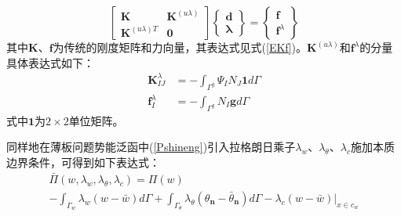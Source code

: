 \begin{equation}
    \begin{bmatrix}\pmb{K}&\pmb{K}^{(u\lambda)}\\\pmb{K}^{(u\lambda) T}&\pmb{0}\end{bmatrix}
    \left\{\begin{matrix}\pmb{d}\\\pmb{\lambda}\end{matrix}\right\}=
    \left\{\begin{matrix}\pmb{f}\\\pmb{f}^{\lambda}\end{matrix}\right\}
\end{equation}
其中$\pmb{K}$、$\pmb{f}$为传统的刚度矩阵和力向量，其表达式见式(\ref{EKf})。$\pmb{K}^{(u\lambda)}$和$\pmb{f}^{\lambda}$的分量具体表达式如下：
\begin{align}
    \pmb K_{I\!J}^{\lambda}&=-\int_{\Gamma^g}\Psi_IN_J \boldsymbol 1d\Gamma\\
    \pmb f_I^{\lambda}&=-\int_{\Gamma^g}N_I\pmb{g}d\Gamma
\end{align}
式中$\boldsymbol 1$为$2\times2$单位矩阵。
\par
同样地在薄板问题势能泛函中(\ref{Pshineng})引入拉格朗日乘子$\lambda_w$、$\lambda_\theta$、$\lambda_c$施加本质边界条件，可得到如下表达式：
\begin{multline}\label{Plambda}
    \bar{\Pi}(w,\lambda_w,\lambda_{\theta},\lambda_c)=\Pi(w) \\ -\int_{\Gamma_w}\lambda_w(w-\bar{w})d\Gamma
    +\int_{\Gamma_{\theta}}\lambda_{\theta}(\theta_{\pmb n}-\bar{\theta}_{\pmb n})d\Gamma
    -\lambda_c(w-\bar{w})\vert_{x\in c_w}
\end{multline}

